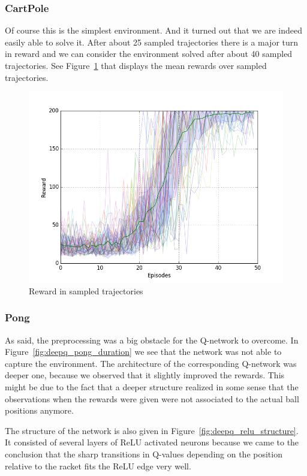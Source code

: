 \documentclass[10pt,a4paper]{article}
\begin{document}
\subsubsection{CartPole}
Of course this is the simplest environment. And it turned out that we are indeed easily able to solve it. After about 25 sampled trajectories there is a major turn in reward and we can consider the environment solved after about 40 sampled trajectories. See Figure~\ref{fig:cartpole_reward} that displays the mean rewards over sampled trajectories.

\begin{figure}[!ht]
  \centering
  \includegraphics[width=1\textwidth]{./figures/cartpole_reward.png}
  \caption{Reward in sampled trajectories}
  \label{fig:cartpole_reward}
\end{figure}

\FloatBarrier
\subsubsection{Pong}
As said, the preprocessing was a big obstacle for the Q-network to overcome. In Figure~\ref{fig:deepq_pong_duration} we see that the network was not able to capture the environment. The architecture of the corresponding Q-network was deeper one, because we observed that it slightly improved the rewards. This might be due to the fact that a deeper structure realized in some sense that the observations when the rewards were given were not associated to the actual ball positions anymore.

The structure of the network is also given in Figure~\ref{fig:deepq_relu_structure}. It consisted of several layers of ReLU activated neurons because we came to the conclusion that the sharp transitions in Q-values depending on the position relative to the racket fits the ReLU edge very well.
\end{document}
